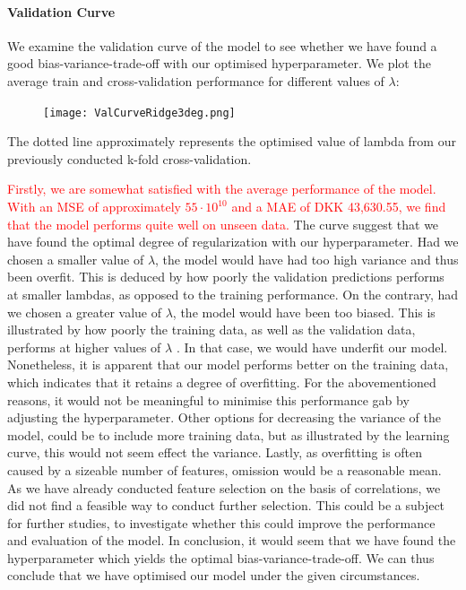 \documentclass[12pt,a4paper]{article}
\begin{document}
\paragraph{Validation Curve}
We examine the validation curve of the model to see whether we have found a good bias-variance-trade-off with our optimised hyperparameter. We plot the average train and cross-validation performance for different values of $\lambda$: 
\begin{figure}[H]
\centering
\caption{}
\texttt{[image: ValCurveRidge3deg.png]}
\end{figure}
The dotted line approximately represents the optimised value of lambda from our previously conducted k-fold cross-validation. 

\textcolor{red}{Firstly, we are somewhat satisfied with the average performance of the model. With an MSE of approximately $55\cdot10^{10}$ and a MAE of DKK 43,630.55, we find that the model performs quite well on unseen data.} 
The curve suggest that we have found the optimal degree of regularization with our hyperparameter. Had we chosen a smaller value of $\lambda$, the model would have had too high variance and thus been overfit. This is deduced by how poorly the validation predictions performs at smaller lambdas, as opposed to the training performance. On the contrary, had we chosen a greater value of $\lambda$, the model would have been too biased. This is illustrated by how poorly the training data, as well as the validation data, performs at higher values of $\lambda$ . In that case, we would have underfit our model. 
Nonetheless, it is apparent that our model performs better on the training data, which indicates that it retains a degree of overfitting. For the abovementioned reasons, it would not be meaningful to minimise this performance gab by adjusting the hyperparameter. Other options for decreasing the variance of the model, could be to include more training data, but as illustrated by the learning curve, this would not seem effect the variance. Lastly, as overfitting is often caused by a sizeable number of features, omission would be a reasonable mean. As we have already conducted feature selection on the basis of correlations, we did not find a feasible way to conduct further selection. This could be a subject for further studies, to investigate whether this could improve the performance and evaluation of the model. \newline
In conclusion, it would seem that we have found the hyperparameter which yields the optimal bias-variance-trade-off. We can thus conclude that we have optimised our model under the given circumstances. 
\end{document}
